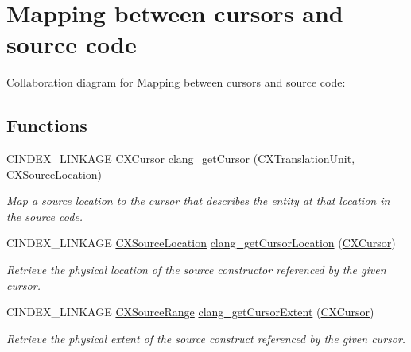 \hypertarget{group__CINDEX__CURSOR__SOURCE}{}\section{Mapping between cursors and source code}
\label{group__CINDEX__CURSOR__SOURCE}
Collaboration diagram for Mapping between cursors and source code\+:
\subsection*{Functions}
\begin{DoxyCompactItemize}
\item 
C\+I\+N\+D\+E\+X\+\_\+\+L\+I\+N\+K\+A\+GE \hyperlink{structCXCursor}{C\+X\+Cursor} \hyperlink{group__CINDEX__CURSOR__SOURCE_ga30a9972c7e099ab2735fa6c45e247ec8}{clang\+\_\+get\+Cursor} (\hyperlink{group__CINDEX_gacdb7815736ca709ce9a5e1ec2b7e16ac}{C\+X\+Translation\+Unit}, \hyperlink{structCXSourceLocation}{C\+X\+Source\+Location})
\begin{DoxyCompactList}\small\item\em Map a source location to the cursor that describes the entity at that location in the source code. \end{DoxyCompactList}\item 
C\+I\+N\+D\+E\+X\+\_\+\+L\+I\+N\+K\+A\+GE \hyperlink{structCXSourceLocation}{C\+X\+Source\+Location} \hyperlink{group__CINDEX__CURSOR__SOURCE_gada3d3cbd3a3e83ff64f992617318dfb1}{clang\+\_\+get\+Cursor\+Location} (\hyperlink{structCXCursor}{C\+X\+Cursor})
\begin{DoxyCompactList}\small\item\em Retrieve the physical location of the source constructor referenced by the given cursor. \end{DoxyCompactList}\item 
C\+I\+N\+D\+E\+X\+\_\+\+L\+I\+N\+K\+A\+GE \hyperlink{structCXSourceRange}{C\+X\+Source\+Range} \hyperlink{group__CINDEX__CURSOR__SOURCE_ga79f6544534ab73c78a8494c4c0bc2840}{clang\+\_\+get\+Cursor\+Extent} (\hyperlink{structCXCursor}{C\+X\+Cursor})
\begin{DoxyCompactList}\small\item\em Retrieve the physical extent of the source construct referenced by the given cursor. \end{DoxyCompactList}\end{DoxyCompactItemize}



